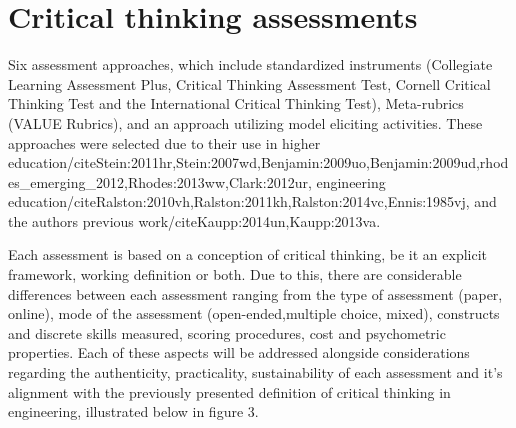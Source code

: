 \section{Critical thinking assessments}


Six assessment approaches, which include standardized instruments (Collegiate Learning Assessment Plus, Critical Thinking Assessment Test, Cornell Critical Thinking Test and the International Critical Thinking Test), Meta-rubrics (VALUE Rubrics), and an approach utilizing model eliciting activities.  These approaches were selected due to their use in higher education/cite{Stein:2011hr,Stein:2007wd,Benjamin:2009uo,Benjamin:2009ud,rhodes_emerging_2012,Rhodes:2013ww,Clark:2012ur}, engineering education/cite{Ralston:2010vh,Ralston:2011kh,Ralston:2014vc,Ennis:1985vj}, and the authors previous work/cite{Kaupp:2014un,Kaupp:2013va}.



Each assessment is based on a conception of critical thinking, be it an explicit framework, working definition or both.  Due to this, there are considerable differences between each assessment ranging from the type of assessment (paper, online), mode of the assessment (open-ended,multiple choice, mixed), constructs and discrete skills measured, scoring procedures, cost and psychometric properties.  Each of these aspects will be addressed alongside considerations regarding the  authenticity, practicality, sustainability of each assessment and it's alignment with the previously presented definition of critical thinking in engineering, illustrated below in figure 3.
